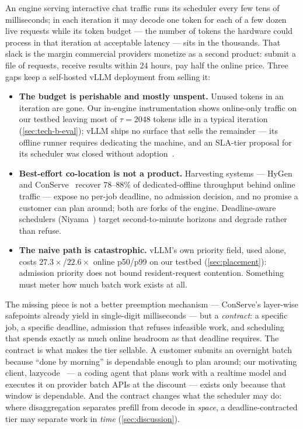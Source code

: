 \documentclass[conference]{IEEEtran}
\begin{document}
An engine serving interactive chat traffic runs its scheduler every few tens of
milliseconds; in each iteration it may decode one token for each of a few dozen live
requests while its token budget --- the number of tokens the hardware could process in
that iteration at acceptable latency --- sits in the thousands. That slack is the margin
commercial providers monetize as a second product: submit a file of requests, receive
results within 24 hours, pay half the online price. Three gaps keep a self-hosted vLLM
deployment from selling it:

\begin{itemize}\itemsep2pt
  \item \textbf{The budget is perishable and mostly unspent.} Unused tokens in an
    iteration are gone. Our in-engine instrumentation shows online-only traffic on our
    testbed leaving most of $\tau=2048$ tokens idle in a typical iteration
    (\cref{sec:tech-b-eval}); vLLM ships no surface that sells the remainder --- its
    offline runner requires dedicating the machine, and an SLA-tier proposal for its
    scheduler was closed without adoption~\citep{vllm-rfc-30256}.
  \item \textbf{Best-effort co-location is not a product.} Harvesting systems ---
    HyGen~\citep{hygen} and ConServe~\citep{conserve} recover 78--88\% of
    dedicated-offline throughput behind online traffic --- expose no per-job deadline, no
    admission decision, and no promise a customer can plan around; both are forks of the
    engine. Deadline-aware schedulers (Niyama~\citep{niyama}) target second-to-minute
    horizons and degrade rather than refuse.
  \item \textbf{The naive path is catastrophic.} vLLM's own priority field, used alone,
    costs $27.3\times$/$22.6\times$ online p50/p99 on our testbed
    (\cref{sec:placement}): admission priority does not bound resident-request
    contention. Something must meter how much batch work exists at all.
\end{itemize}

The missing piece is not a better preemption mechanism --- ConServe's layer-wise
safepoints already yield in single-digit milliseconds --- but a \emph{contract}: a
specific job, a specific deadline, admission that refuses infeasible work, and scheduling
that spends exactly as much online headroom as that deadline requires. The contract is
what makes the tier sellable. A customer submits an overnight batch because ``done by
morning'' is dependable enough to plan around; our motivating client,
lazycode~\citep{lazycode,lazycode-paper} --- a coding agent that plans work with a
realtime model and executes it on provider batch APIs at the discount --- exists only
because that window is dependable. And the contract changes what the scheduler may do:
where disaggregation separates prefill from decode in \emph{space}, a
deadline-contracted tier may separate work in \emph{time} (\cref{sec:discussion}).
\end{document}
